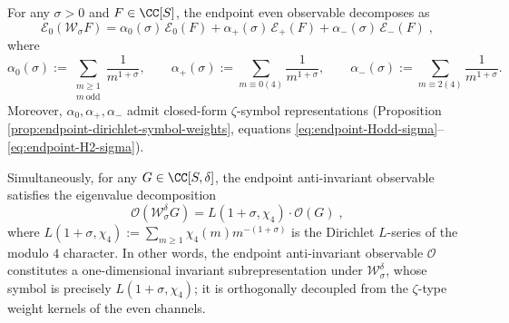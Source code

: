 \begin{theorem}\label{thm:endpoint-zeta-Lchi4-symbol-pair}
For any \(\sigma>0\) and \(F\in\CC[S]\), the endpoint even observable decomposes as
\begin{equation}\label{eq:endpoint-even-symbol-decomposition-alpha}
\boxed{\;
\mathcal E_{0}(\mathcal W_{\sigma}F)
=\alpha_{0}(\sigma)\,\mathcal E_{0}(F)+\alpha_{+}(\sigma)\,\mathcal E_{+}(F)+\alpha_{-}(\sigma)\,\mathcal E_{-}(F)\; },
\end{equation}
where
\[
\alpha_{0}(\sigma):=\sum_{\substack{m\ge 1\\ m\ \mathrm{odd}}}\frac{1}{m^{1+\sigma}},\qquad
\alpha_{+}(\sigma):=\sum_{m\equiv 0(4)}\frac{1}{m^{1+\sigma}},\qquad
\alpha_{-}(\sigma):=\sum_{m\equiv 2(4)}\frac{1}{m^{1+\sigma}}.
\]
Moreover, \(\alpha_{0},\alpha_{+},\alpha_{-}\) admit closed-form \(\zeta\)-symbol representations (Proposition \ref{prop:endpoint-dirichlet-symbol-weights}, equations \eqref{eq:endpoint-Hodd-sigma}--\eqref{eq:endpoint-H2-sigma}).
\par
Simultaneously, for any \(G\in\CC[S,\delta]\), the endpoint anti-invariant observable satisfies the eigenvalue decomposition
\begin{equation}\label{eq:endpoint-odd-symbol-eigen}
\boxed{\;
\mathcal O(\mathcal W_{\sigma}^{\delta}G)
=L(1+\sigma,\chi_{4})\cdot \mathcal O(G)\; },
\end{equation}
where
\(
L(1+\sigma,\chi_{4}):=\sum_{m\ge 1}\chi_{4}(m)m^{-(1+\sigma)}
\)
is the Dirichlet \(L\)-series of the modulo \(4\) character.
In other words, the endpoint anti-invariant observable \(\mathcal O\) constitutes a one-dimensional invariant subrepresentation under \(\mathcal W_{\sigma}^{\delta}\), whose symbol is precisely \(L(1+\sigma,\chi_{4})\); it is orthogonally decoupled from the \(\zeta\)-type weight kernels of the even channels.
\end{theorem}
